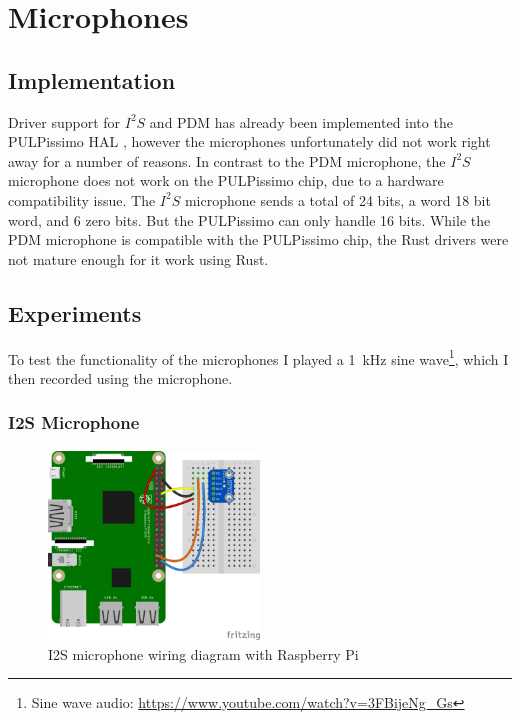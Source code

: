 

\section{Microphones}

\subsection{Implementation}

Driver support for $I^2S$ and PDM has already been implemented into the PULPissimo HAL \cite[Cha 4.3.7]{rust_pulp},
however the microphones unfortunately did not work right away for a number of reasons.
In contrast to the PDM microphone, the $I^2S$ microphone does not work on the PULPissimo chip, due to a hardware compatibility issue.
The $I^2S$ microphone sends a total of 24 bits, a word 18 bit word, and 6 zero bits. But the PULPissimo can only handle 16 bits.
While the PDM microphone is compatible with the PULPissimo chip, the Rust drivers were not mature enough for it work using Rust.

\subsection{Experiments}

To test the functionality of the microphones I played a \SI{1}{\kilo\hertz} sine wave\footnote{Sine wave audio: \url{https://www.youtube.com/watch?v=3FBijeNg_Gs}},
which I then recorded using the microphone.

\subsubsection{I2S Microphone}

\begin{figure}[H]
    \centering
    \includegraphics[width=0.5\textwidth]{figures/i2s/wiring_pi.png}
    \caption[I2S microphone wiring diagram with Raspberry Pi \cite{i2s_wiring}]{I2S microphone wiring diagram with Raspberry Pi}
    \label{fig:i2s_wiring}
\end{figure}

